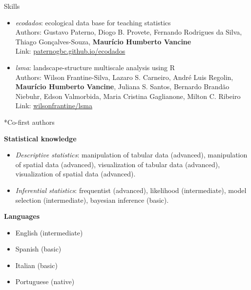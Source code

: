 \documentclass{resume}
\begin{document}
\begin{rSection}{Skills}
\begin{itemize}
\item {\it ecodados}: ecological data base for teaching statistics\\
Authors: Gustavo Paterno, Diogo B. Provete, Fernando Rodrigues da Silva, Thiago Gonçalves-Souza, {\bf Maurício Humberto Vancine}\\
Link: \href{https://paternogbc.github.io/ecodados/}{\underline{paternogbc.github.io/ecodados}}

\item {\it lsma}: landscape-structure multiscale analysis using R\\
Authors: Wilson Frantine-Silva, Lazaro S. Carneiro, André Luis Regolin, {\bf Maurício Humberto Vancine}, Juliana S. Santos, Bernardo Brandão Niebuhr, Edson Valmorbida, Maria Cristina Gaglianone, Milton C. Ribeiro\\
Link: \href{https://github.com/wilsonfrantine/landscapeDecoupler}{\underline{wilsonfrantine/lsma}}

\end{itemize} 

*Co-first authors

{\bf Statistical knowledge}

\begin{itemize} 
\item {\it Descriptive statistics}: manipulation of tabular data (advanced), manipulation of spatial data (advanced), visualization of tabular data (advanced), visualization of spatial data (advanced).

\item {\it Inferential statistics}: frequentist (advanced), likelihood (intermediate), model selection (intermediate), bayesian inference (basic).
\end{itemize}

{\bf Languages}
\begin{itemize}
\item English (intermediate)
\item Spanish (basic)
\item Italian (basic)
\item Portuguese (native)
\end{itemize}

\end{rSection}

\end{document}
